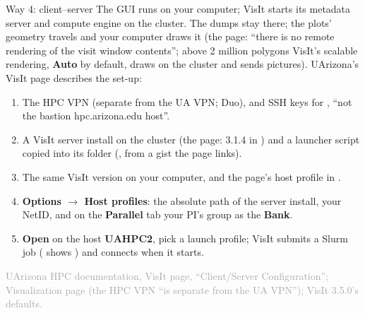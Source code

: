 \documentclass[aspectratio=169,11pt]{beamer}
\newcommand{\sourcecredit}[1]{\vfill\begin{flushright}\tiny\textcolor{DarkGray}{#1}\end{flushright}}
\newcommand{\gui}[1]{\textsf{\textbf{#1}}}
\begin{document}
\begin{frame}{Way 4: client--server}
\label{fr:cs}
\footnotesize
The GUI runs on your computer; VisIt starts its metadata server and compute engine on the cluster. The dumps stay there; the plots' geometry travels and your computer draws it (the page: ``there is no remote rendering of the visit window contents''; above 2 million polygons VisIt's scalable rendering, \gui{Auto} by default, draws on the cluster and sends pictures). UArizona's VisIt page describes the set-up:
\begin{enumerate}\setlength{\itemsep}{1pt}
  \item The HPC VPN (separate from the UA VPN; Duo), and SSH keys for , ``not the bastion hpc.arizona.edu host''.
  \item A VisIt server install on the cluster (the page: 3.1.4 in ) and a launcher script copied into its  folder (, from a gist the page links).
  \item The same VisIt version on your computer, and the page's host profile  in .
  \item \gui{Options $\to$ Host profiles}: the absolute path of the server install, your NetID, and on the \gui{Parallel} tab your PI's group as the \gui{Bank}.
  \item \gui{Open} on the host \gui{UAHPC2}, pick a launch profile; VisIt submits a Slurm job ( shows ) and connects when it starts.
\end{enumerate}
\sourcecredit{UArizona HPC documentation, VisIt page, ``Client/Server Configuration''; Visualization page (the HPC VPN ``is separate from the UA VPN''); VisIt 3.5.0's \code{RenderingAttributes()} defaults.}
\end{frame}
\end{document}
